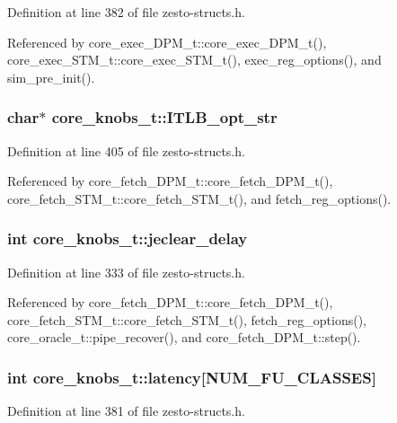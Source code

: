 Definition at line 382 of file zesto-structs.h.

Referenced by core\_\-exec\_\-DPM\_\-t::core\_\-exec\_\-DPM\_\-t(), core\_\-exec\_\-STM\_\-t::core\_\-exec\_\-STM\_\-t(), exec\_\-reg\_\-options(), and sim\_\-pre\_\-init().
\subsubsection[{ITLB\_\-opt\_\-str}]{\setlength{\rightskip}{0pt plus 5cm}char$\ast$ {\bf core\_\-knobs\_\-t::ITLB\_\-opt\_\-str}}\label{structcore__knobs__t_2e29aaddde4cbc5d4119dea95374b45b}




Definition at line 405 of file zesto-structs.h.

Referenced by core\_\-fetch\_\-DPM\_\-t::core\_\-fetch\_\-DPM\_\-t(), core\_\-fetch\_\-STM\_\-t::core\_\-fetch\_\-STM\_\-t(), and fetch\_\-reg\_\-options().
\subsubsection[{jeclear\_\-delay}]{\setlength{\rightskip}{0pt plus 5cm}int {\bf core\_\-knobs\_\-t::jeclear\_\-delay}}\label{structcore__knobs__t_c899955252aaaa5b0bd449e2e0ed05f7}




Definition at line 333 of file zesto-structs.h.

Referenced by core\_\-fetch\_\-DPM\_\-t::core\_\-fetch\_\-DPM\_\-t(), core\_\-fetch\_\-STM\_\-t::core\_\-fetch\_\-STM\_\-t(), fetch\_\-reg\_\-options(), core\_\-oracle\_\-t::pipe\_\-recover(), and core\_\-fetch\_\-DPM\_\-t::step().
\subsubsection[{latency}]{\setlength{\rightskip}{0pt plus 5cm}int {\bf core\_\-knobs\_\-t::latency}[NUM\_\-FU\_\-CLASSES]}\label{structcore__knobs__t_0cefeb1d280f9966c8075ddfcfe14c75}




Definition at line 381 of file zesto-structs.h.

